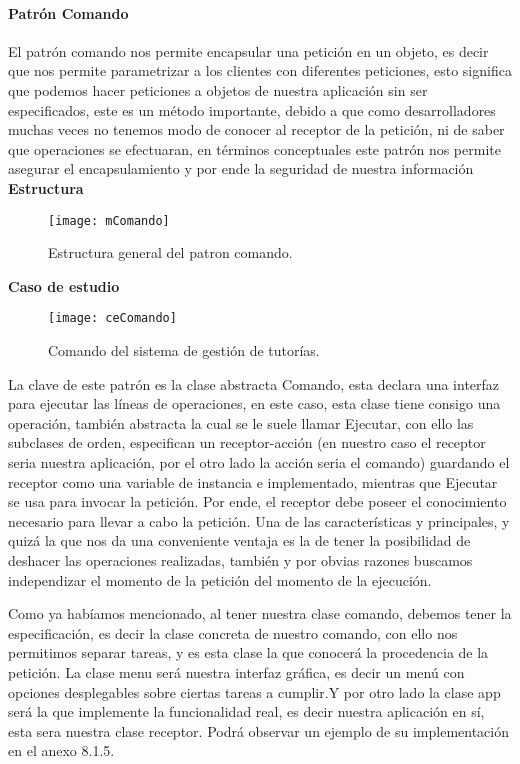 \paragraph{Patrón Comando}
El patrón comando nos permite encapsular una petición en un objeto, es decir que nos permite parametrizar a los clientes con diferentes peticiones, esto significa que podemos hacer peticiones a objetos de nuestra aplicación sin ser especificados, este es un método importante, debido a que como desarrolladores muchas veces no tenemos modo de conocer al receptor de la petición, ni de saber que operaciones se efectuaran, en términos conceptuales este patrón nos permite asegurar el encapsulamiento y por ende la seguridad de nuestra información
\newline
\indent\textbf{Estructura}
\begin{figure}[H]
	\centering
	\texttt{[image: mComando]}
    \centering
    \caption{Estructura general del patron comando.}
	\label{fig:mComando}
\end{figure}
\clearpage
\indent\textbf{Caso de estudio}
\begin{figure}[H]
	\centering
	\texttt{[image: ceComando]}
    \centering
    \caption{Comando del sistema de gestión de tutorías.}
	\label{fig:ceComando}
\end{figure}
\indent La clave de este patrón es la clase abstracta Comando, esta declara una interfaz para ejecutar las líneas de operaciones, en este caso, esta clase tiene consigo una operación, también abstracta la cual se le suele llamar Ejecutar, con ello las subclases de orden, especifican un receptor-acción (en nuestro caso el receptor seria nuestra aplicación, por el otro lado la acción seria el comando) guardando el receptor como una variable de instancia e implementado, mientras que Ejecutar se usa para invocar la petición. Por ende, el receptor debe poseer el conocimiento necesario para llevar a cabo la petición. Una de las características y principales, y quizá la que nos da una conveniente ventaja es la de tener la posibilidad de deshacer las operaciones realizadas, también y por obvias razones buscamos independizar el momento de la petición del momento de la ejecución.
\newline

Como ya habíamos mencionado, al tener nuestra clase comando, debemos tener la especificación, es decir la clase concreta de nuestro comando, con ello nos permitimos separar tareas, y es esta clase la que conocerá la procedencia de la petición.  La clase menu será nuestra interfaz gráfica, es decir un menú con opciones desplegables sobre ciertas tareas a cumplir.Y por otro lado la clase app será la que implemente la funcionalidad real, es decir nuestra aplicación en sí, esta sera nuestra clase receptor. Podrá observar un ejemplo de su implementación en el anexo 8.1.5.
\newpage
